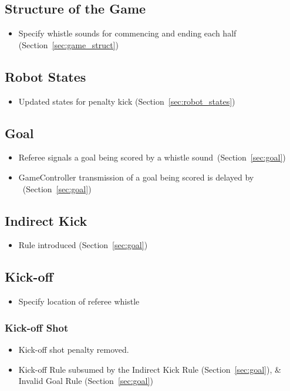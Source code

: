 \subsection*{Structure of the Game}
\begin{itemize}
  \item Specify whistle sounds for commencing and ending each half (\cf Section~\ref{sec:game_struct})
\end{itemize}

\subsection*{Robot States}
\begin{itemize}
  \item Updated states for penalty kick (\cf Section~\ref{sec:robot_states})
\end{itemize}

\subsection*{Goal}
\begin{itemize}
  \item Referee signals a goal being scored by a whistle sound~(\cf Section~\ref{sec:goal})
  \item GameController transmission of a goal being scored is delayed by \GoalScoredDelay~(\cf Section~\ref{sec:goal})
\end{itemize}

\subsection*{Indirect Kick}
\begin{itemize}
  \item Rule introduced (\cf Section~\ref{sec:goal})
\end{itemize}

\subsection*{Kick-off}
\begin{itemize}
  \item Specify location of referee whistle
\end{itemize}

\subsubsection*{Kick-off Shot}
\begin{itemize}
  \item Kick-off shot penalty removed.
  \item Kick-off Rule subsumed by the Indirect Kick Rule (\cf Section~\ref{sec:goal}), \& Invalid Goal Rule (\cf Section~\ref{sec:goal})
\end{itemize}


